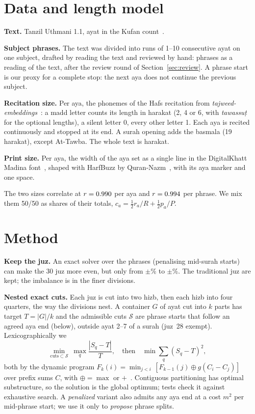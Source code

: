 \documentclass[conference]{IEEEtran}
\begin{document}
\section{Data and length model}\label{sec:data}
\textbf{Text.} Tanzil Uthmani 1.1, \Ayat{} ayat in the Kufan count~\cite{tanzil}.

\textbf{Subject phrases.} The text was divided into runs of 1--10 consecutive ayat on one subject,
drafted by reading the text and reviewed by hand: \PhrasesReading{} phrases as a reading of the
text, \Phrases{} after the review round of Section~\ref{sec:review}. A phrase start is our proxy
for a complete stop: the next aya does not continue the previous subject.

\textbf{Recitation size.} Per aya, the phonemes of the Hafs recitation from
\emph{tajweed-embeddings}~\cite{tajemb}: a madd letter counts its length in harakat (2, 4 or 6,
with \emph{tawassuṭ} for the optional lengths), a silent letter 0, every other letter 1. Each aya
is recited continuously and stopped at its end. A surah opening adds the basmala (19 harakat),
except At-Tawba. The whole text is \RecitationTotal{} harakat.

\textbf{Print size.} Per aya, the width of the aya set as a single line in the DigitalKhatt
Madina font~\cite{digitalkhatt}, shaped with HarfBuzz by Quran-Nazm~\cite{nazm}, with its aya
marker and one space.

The two sizes correlate at $r=0.990$ per aya and $r=0.994$ per phrase. We mix them
50/50 as shares of their totals, $c_a = \tfrac12 r_a/R + \tfrac12 p_a/P$.

\section{Method}
\textbf{Keep the juz.} An exact solver over the phrases (penalising mid-surah starts) can make the
30 juz more even, but only from $\pm$\TradJuzWorst\% to $\pm$\OptJuzWorst\%. The traditional juz are
kept; the imbalance is in the finer divisions.

\textbf{Nested exact cuts.} Each juz is cut into two hizb, then each hizb into four quarters, the
way the divisions nest. A container $G$ of ayat cut into $k$ parts has target $T=|G|/k$ and the
admissible cuts $\mathcal{S}$ are phrase starts that follow an agreed aya end (below), outside ayat 2--7 of a surah (juz~28 exempt). Lexicographically we
\begin{equation}
\min_{\text{cuts}\subset\mathcal{S}}\ \max_q \frac{|S_q - T|}{T},\quad\text{then}\quad
\min \sum_q (S_q-T)^2 ,
\end{equation}
both by the dynamic program $F_k(i)=\min_{j<i}\,[F_{k-1}(j)\oplus g(C_i-C_j)]$ over prefix sums $C$,
with $\oplus=\max$ or $+$~\cite{bellman}. Contiguous partitioning has optimal substructure, so the
solution is the global optimum; tests check it against exhaustive search. A \emph{penalized}
variant also admits any aya end at a cost $m^2$ per mid-phrase start; we use it only to
\emph{propose} phrase splits.
\end{document}
